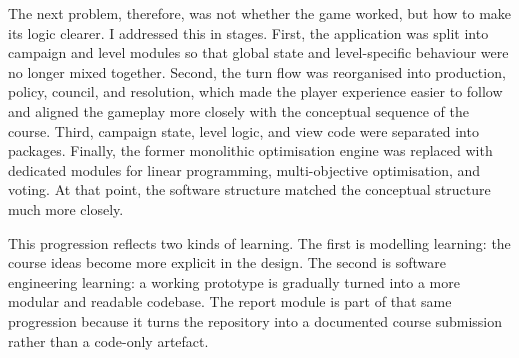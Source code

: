 The next problem, therefore, was not whether the game worked, but how to
make its logic clearer. I addressed this in stages. First, the
application was split into campaign and level modules so that global
state and level-specific behaviour were no longer mixed together.
Second, the turn flow was reorganised into production, policy, council,
and resolution, which made the player experience easier to follow and
aligned the gameplay more closely with the conceptual sequence of the
course. Third, campaign state, level logic, and view code were separated
into packages. Finally, the former monolithic optimisation engine was
replaced with dedicated modules for linear programming,
multi-objective optimisation, and voting. At that point, the software
structure matched the conceptual structure much more closely.

This progression reflects two kinds of learning. The first is modelling
learning: the course ideas become more explicit in the design. The
second is software engineering learning: a working prototype is
gradually turned into a more modular and readable codebase. The report
module is part of that same progression because it turns the repository
into a documented course submission rather than a code-only artefact.

